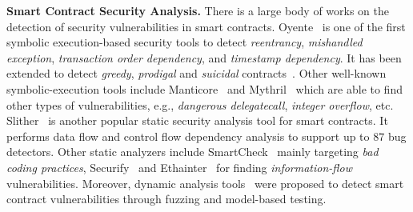 \noindent
\textbf{Smart Contract Security Analysis.}
There is a large body of works on the detection of security
vulnerabilities in smart contracts.
Oyente~\cite{luu2016making} is one of the first symbolic execution-based security tools to detect \textit{reentrancy}, \textit{mishandled exception}, \textit{transaction order dependency}, and \textit{timestamp dependency}.
It has been extended to detect \textit{greedy}, \textit{prodigal} and \textit{suicidal}
contracts~\cite{nikolic2018finding}.
Other well-known symbolic-execution tools include Manticore~\cite{manticore} and
Mythril~\cite{mythril} which are able to find other types of vulnerabilities, e.g.,
\textit{dangerous delegatecall}, \textit{integer overflow}, etc.
Slither~\cite{slither} is another popular static security analysis tool for smart contracts.
It performs data flow and control flow dependency analysis to support up to $87$ bug detectors.
Other static analyzers include SmartCheck~\cite{tikhomirov2018smartcheck} mainly targeting
\textit{bad coding practices}, Securify~\cite{securify} and Ethainter~\cite{brent2020ethainter}
for finding \textit{information-flow} vulnerabilities.
Moreover, dynamic analysis tools~\cite{2018contractfuzzer, atzei2017survey, nguyen2020sfuzz,
echidna, wustholz2020harvey, wang2020oracle, liu2020modcon} were proposed to detect smart contract
vulnerabilities through fuzzing and model-based testing.
